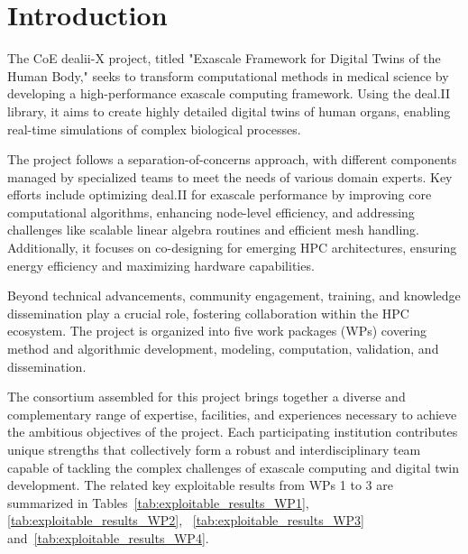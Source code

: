 \documentclass[a4paper,12pt]{article}
\begin{document}
\vspace*{2cm}

\disclaimer

\newpage

\tableofcontents %

\newpage

\section{{Introduction}} \label{sec:introduction}

The CoE dealii-X project, titled "Exascale Framework for Digital Twins of the Human Body," seeks to transform computational methods in medical science by developing a high-performance exascale computing framework. Using the deal.II library, it aims to create highly detailed digital twins of human organs, enabling real-time simulations of complex biological processes.

The project follows a separation-of-concerns approach, with different components managed by specialized teams to meet the needs of various domain experts. Key efforts include optimizing deal.II for exascale performance by improving core computational algorithms, enhancing node-level efficiency, and addressing challenges like scalable linear algebra routines and efficient mesh handling. Additionally, it focuses on co-designing for emerging HPC architectures, ensuring energy efficiency and maximizing hardware capabilities.

Beyond technical advancements, community engagement, training, and knowledge dissemination play a crucial role, fostering collaboration within the HPC ecosystem. The project is organized into five work packages (WPs) covering method and algorithmic development, modeling, computation, validation, and dissemination.

The consortium assembled for this project brings together a diverse and complementary range of expertise, facilities, and experiences necessary to achieve the ambitious objectives of the project. Each participating institution contributes unique strengths that collectively form a robust and interdisciplinary team capable of tackling the complex challenges of exascale computing and digital twin development. The related key exploitable results from WPs 1 to 3 are summarized in Tables~\ref{tab:exploitable_results_WP1}, \ref{tab:exploitable_results_WP2}, ~\ref{tab:exploitable_results_WP3} and~\ref{tab:exploitable_results_WP4}.
\end{document}
